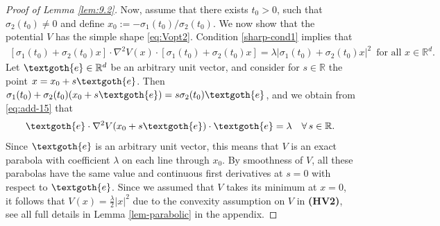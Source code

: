\documentclass[reqno]{amsart}
\newcommand{\R}{\mathbb{R}}
\newcommand{\Rd}{{\R^d}}
\begin{document}
\begin{proof}[Proof of Lemma \ref{lem:9.2}]
  Now, assume that there exists $t_0>0$, such that $\sigma_2(t_0)\neq 0$ and define $x_0:=-\sigma_1(t_0)/\sigma_2(t_0)$. We now show that the potential $V$ has the simple shape \eqref{eq:Vopt2}. Condition \eqref{sharp-cond1} implies that
  \begin{align}
    \label{eq:add-15}
    [\sigma_1(t_0)+\sigma_2(t_0)x]\cdot\nabla^2V(x) \cdot[\sigma_1(t_0)+\sigma_2(t_0)x] = \lambda|\sigma_1(t_0)+\sigma_2(t_0)x|^2\, \mbox{ for all } x\in \Rd.
  \end{align}
  Let $\textgoth{e}\in\R^d$ be an arbitrary unit vector, and consider for $s\in\R$ the point $x=x_0+s\textgoth{e}$. Then $\sigma_1(t_0)+\sigma_2(t_0)(x_0+s\textgoth{e})=s\sigma_2(t_0)\textgoth{e}$, and we obtain from \eqref{eq:add-15} that
  \begin{align*}
\textgoth{e}\cdot\nabla^2V(x_0+s\textgoth{e})\cdot \textgoth{e} = \lambda
\quad \forall\,s\in\R.
  \end{align*}
  Since $\textgoth{e}$ is an arbitrary unit vector, this means that $V$ is an exact parabola with coefficient $\lambda$ on each line through $x_0$. By smoothness of $V$, all these parabolas have the same value and continuous first derivatives at $s=0$ with respect to $\textgoth{e}$. Since we assumed that $V$ takes its minimum at $x=0$, it follows that $V(x)=\frac\lambda2|x|^2$ due to the convexity assumption on $V$ in {\bf (HV2)}, see all full details in Lemma \ref{lem-parabolic} in the appendix.


\end{proof}
\end{document}
